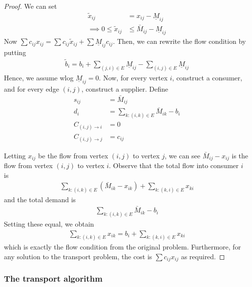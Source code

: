 \documentclass{../../template/note}
\begin{document}
    \begin{proof}
        We can set
        \begin{align*}
            \tilde x_{ij} &= x_{ij} - \underline M_{ij} \\
            \implies 0 \leq \tilde x_{ij} &\leq \bar M_{ij} - \underline M_{ij}
        \end{align*}
        Now $\sum c_{ij} x_{ij} = \sum c_{ij} \tilde x_{ij} + \sum \underline M_{ij} c_{ij}$. Then, we can rewrite the flow condition by putting
        \begin{align*}
            \tilde b_i = b_i + \sum_{(j, i) \in E} \underline M_{ij} - \sum_{(i, j) \in E} \underline M_{ij}
        \end{align*}
        Hence, we assume wlog $\underline M_{ij} = 0$. Now, for every vertex $i$, construct a consumer, and for every edge $(i, j)$, construct a supplier. Define
        \begin{align*}
            s_{ij} &= \bar M_{ij} \\
            d_i &= \sum_{k: (i, k) \in E} \bar M_{ik} - b_i \\
            C_{(i, j) \to i} &= 0 \\
            C_{(i, j) \to j} &= c_{ij}
        \end{align*}

        Letting $x_{ij}$ be the flow from vertex $(i, j)$ to vertex $j$, we can see $\bar M_{ij} - x_{ij}$ is the flow from vertex $(i, j)$ to vertex $i$. Observe that the total flow into consumer $i$ is
        \begin{align*}
            \sum_{k: (i, k) \in E} (\bar M_{ik} - x_{ik}) + \sum_{k: (k, i) \in E} x_{ki}
        \end{align*}
        and the total demand is
        \begin{align*}
            \sum_{k: (i, k) \in E} \bar M_{ik} - b_i
        \end{align*}
        Setting these equal, we obtain
        \begin{align*}
            \sum_{k: (i, k) \in E} x_{ik} = b_i + \sum_{k: (k, i) \in E} x_{ki}
        \end{align*}
        which is exactly the flow condition from the original problem. Furthermore, for any solution to the transport problem, the cost is $\sum c_{ij} x_{ij}$ as required.  
    \end{proof}
    
    \subsubsection{The transport algorithm}
\end{document}

